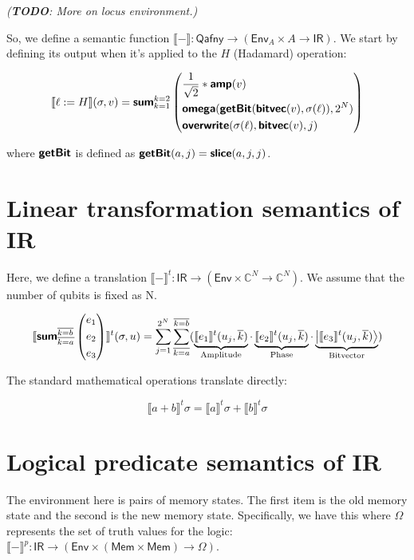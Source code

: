 \documentclass[runningheads]{llncs}
\newcommand {\ra} {\rightarrow}
\newcommand {\Env} {\textsf{Env}}
\newcommand {\sem} [1] {\llbracket #1 \rrbracket}
\newcommand {\Psem} [1] {\sem{#1}^p}
\newcommand {\Tsem} [1] {\sem{#1}^t}
\newcommand {\Mem} {\textsf{Mem}}
\newcommand {\ket}[1]{\ensuremath{\left|#1\right\rangle}}
\newcommand {\ir} [1] {\textsf{\textbf{#1}}}
\newcommand {\IRep} {\textsf{IR}}
\newcommand {\irSum} {\ir{sum}}
\newcommand {\irOverwrite} {\ir{overwrite}}
\newcommand {\irSlice} {\ir{slice}}
\newcommand {\irGetBit} {\ir{getBit}}
\newcommand {\irAmp} {\ir{amp}}
\newcommand {\irBV} {\ir{bitvec}}
\newcommand {\irOmega} {\ir{omega}}
\newcommand {\truthVals} {\Omega}
\newcommand {\Qafny} {\textsf{Qafny}}
\begin{document}
\textit{(\textbf{TODO}: More on locus environment.)}

So, we define a semantic function $\sem{-} : \Qafny \ra (\Env_A \times A \ra \IRep)$. We start by defining its output when it's applied to the $H$ (Hadamard) operation:

\[
  \sem{\ell := H}(\sigma, v) = \irSum_{k=1}^{k=2}
    \left(\begin{aligned}
      &\frac{1}{\sqrt{2}} * \irAmp(v)\\
      &\irOmega(\irGetBit(\irBV(v), \sigma(\ell)), 2^N)\\
      &\irOverwrite(\sigma(\ell), \irBV(v), j)
      \end{aligned}\right)
\]

where $\irGetBit$ is defined as $\irGetBit(a, j) = \irSlice(a, j, j)$.

\section{Linear transformation semantics of IR}

Here, we define a translation $\Tsem{-} : \IRep \ra (\Env \times \mathbb{C}^N \ra \mathbb{C}^N)$. We assume that the number of qubits is fixed as N.

\[
  \Tsem{\irSum_{\overline{k=a}}^{\overline{k=b}}
    \left(\begin{aligned}
      &e_1\\
      &e_2\\
      &e_3
    \end{aligned}\right)}(\sigma, u)
    =
    \sum_{j=1}^{2^N}\sum_{\overline{k=a}}^{\overline{k=b}}
      (\underbrace{\Tsem{e_1}(u_j, \overline{k})}_{\textnormal{Amplitude}} \cdot \underbrace{\Tsem{e_2}(u_j, \overline{k})}_{\textnormal{Phase}} \cdot \underbrace{\ket{\Tsem{e_3}(u_j, \overline{k})}}_{\textnormal{Bitvector}})
\]

\noindent
The standard mathematical operations translate directly:

\[
  \Tsem{a + b}\sigma = \Tsem{a}\sigma + \Tsem{b}\sigma
\]

\section{Logical predicate semantics of IR}

The environment here is pairs of memory states. The first item is the old memory state and the second is the new memory state. Specifically, we have this where $\truthVals$ represents the set of truth values for the logic: $\Psem{-} : \IRep \ra (\Env \times (\Mem \times \Mem) \ra \truthVals)$.
\end{document}
